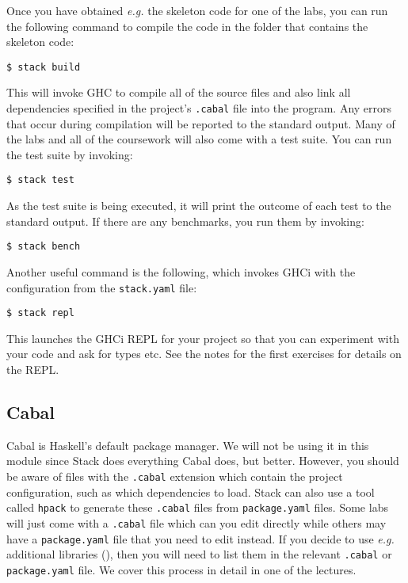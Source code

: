 Once you have obtained \emph{e.g.} the skeleton code for one of the labs, you can run the following command to compile the code in the folder that contains the skeleton code:
\begin{verbatim}
$ stack build
\end{verbatim}
This will invoke GHC to compile all of the source files and also link all dependencies specified in the project's \texttt{\small .cabal} file into the program. Any errors that occur during compilation will be reported to the standard output. Many of the labs and all of the coursework will also come with a test suite. You can run the test suite by invoking:
\begin{verbatim}
$ stack test
\end{verbatim}
As the test suite is being executed, it will print the outcome of each test to the standard output. If there are any benchmarks, you run them by invoking:
\begin{verbatim}
$ stack bench
\end{verbatim}
Another useful command is the following, which invokes GHCi with the configuration from the \texttt{\small stack.yaml} file:
\begin{verbatim}
$ stack repl
\end{verbatim}
This launches the GHCi REPL for your project so that you can experiment with your code and ask for types etc. See the notes for the first exercises for details on the REPL.

\subsection{Cabal}

Cabal is Haskell's default package manager. We will not be using it in this module since Stack does everything Cabal does, but better. However, you should be aware of files with the \texttt{\small .cabal} extension which contain the project configuration, such as which dependencies to load. Stack can also use a tool called \texttt{\small hpack} to generate these \texttt{\small .cabal} files from \texttt{\small package.yaml} files. Some labs will just come with a \texttt{\small .cabal} file which can you edit directly while others may have a \texttt{\small package.yaml} file that you need to edit instead. If you decide to use \emph{e.g.} additional libraries (), then you will need to list them in the relevant \texttt{\small .cabal} or \texttt{\small package.yaml} file. We cover this process in detail in one of the lectures.

